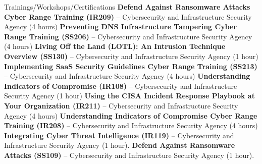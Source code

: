 \begin{rubric}{Trainings/Workshops/Certifications}
%
    \entry*[8/19/2025] \textbf{Defend Against Ransomware Attacks Cyber Range Training (IR209)} -- Cybersecurity and Infrastructure Security Agency (4 hours) \href{https://github.com/amantaya/curriculum-vitae/blob/master/certifications/IR209_Aug19_2025_Course_Completion_Certificate.pdf}{\scriptsize\faLink}
%
    \entry*[7/24/2025] \textbf{Preventing DNS Infrastructure Tampering Cyber Range Training (SS206)} -- Cybersecurity and Infrastructure Security Agency (4 hours) \href{https://github.com/amantaya/curriculum-vitae/blob/master/certifications/SS206_Course_Completion_Certificate.pdf}{\scriptsize\faLink}
%
    \entry*[7/22/2025] \textbf{Living Off the Land (LOTL): An Intrusion Technique Overview (SS130)} -- Cybersecurity and Infrastructure Security Agency (1 hour)
%
    \entry*[7/17/2025] \textbf{Implementing SaaS Security Guidelines Cyber Range Training (SS213)} -- Cybersecurity and Infrastructure Security Agency (4 hours) \href{https://github.com/amantaya/curriculum-vitae/blob/master/certifications/SS213_Course_Completion_Certificate.pdf}{\scriptsize\faLink}
%
    \entry*[7/03/2025] \textbf{Understanding Indicators of Compromise (IR108)} -- Cybersecurity and Infrastructure Security Agency (1 hour) \href{https://github.com/amantaya/curriculum-vitae/blob/master/certifications/IR108_JUL2-2025_CertificateofAttendance.pdf}{\scriptsize\faLink}
%
    \entry*[6/24/2025] \textbf{Using the CISA Incident Response Playbook at Your Organization (IR211)} -- Cybersecurity and Infrastructure Security Agency (4 hours) \href{https://github.com/amantaya/curriculum-vitae/blob/master/certifications/IR211_JUN24-2025_CertificateofAttendance.pdf}{\scriptsize\faLink}
%
    \entry*[6/10/2025] \textbf{Understanding Indicators of Compromise Cyber Range Training (IR208)} -- Cybersecurity and Infrastructure Security Agency (4 hours) \href{https://github.com/amantaya/curriculum-vitae/blob/master/certifications/IR208_June10_2025_Course_Completion_Certificate.pdf}{\scriptsize\faLink}
%
    \entry*[6/09/2025] \textbf{Integrating Cyber Threat Intelligence (IR119)} -- Cybersecurity and Infrastructure Security Agency (1 hour). \href{https://github.com/amantaya/curriculum-vitae/blob/master/certifications/IR119_CoC_060925%201.pdf}{\scriptsize\faLink}
%
    \entry*[5/28/2025] \textbf{Defend Against Ransomware Attacks (SS109)} -- Cybersecurity and Infrastructure Security Agency (1 hour). \href{https://github.com/amantaya/curriculum-vitae/blob/master/certifications/SS109_MAY28-2025_CertificateofAttendance.pdf}{\scriptsize\faLink}

\end{rubric}
